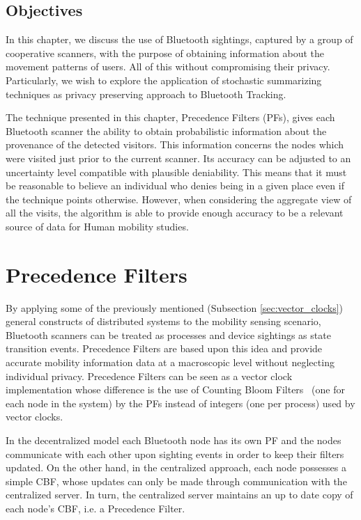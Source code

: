 \subsection{Objectives}
\label{sec:ct-objectives}
In this chapter, we discuss the use of Bluetooth sightings, captured
by a group of cooperative scanners, with the purpose of obtaining
information about the movement patterns of users. All of this
without compromising their privacy. Particularly, we wish to explore
the application of stochastic summarizing techniques as privacy
preserving approach to Bluetooth Tracking.

The technique presented in this chapter, Precedence Filters (PFs), gives
each Bluetooth scanner the ability to obtain probabilistic information
about the provenance of the detected visitors. This information
concerns the nodes which were visited just prior to the current
scanner. Its accuracy can be adjusted to an uncertainty level
compatible with plausible deniability. This means that it must be
reasonable to believe an individual who denies being in a given place
even if the technique points
otherwise. %
However, when considering the aggregate view of all the visits, the
algorithm is able to provide enough accuracy to be a relevant source
of data for Human mobility studies.

\section{Precedence Filters}
\label{sec:precedence-filters}
By applying some of the previously mentioned (Subsection
\ref{sec:vector_clocks}) general constructs of distributed systems to
the mobility sensing scenario, Bluetooth scanners can be treated as
processes and device sightings as state transition events. Precedence
Filters are based upon this idea and provide accurate mobility
information data at a macroscopic level without neglecting individual
privacy.  Precedence Filters can be seen as a vector clock
\cite{Fidge,Mattern} implementation whose difference is the use of
Counting Bloom Filters~\cite{Fan98summarycache:,Mitzenmacher:2002:CBF:581876.581878} (one for each node in the system) by the PFs
instead of integers (one per process) used by vector clocks.

In the decentralized model each Bluetooth node has its own PF and the
nodes communicate with each other upon sighting events in order to
keep their filters updated. On the other hand, in the centralized
approach, each node possesses a simple CBF, whose updates can only be
made through communication with the centralized server. In turn, the 
centralized server maintains an up to date copy of each node's CBF,
i.e. a Precedence Filter.

